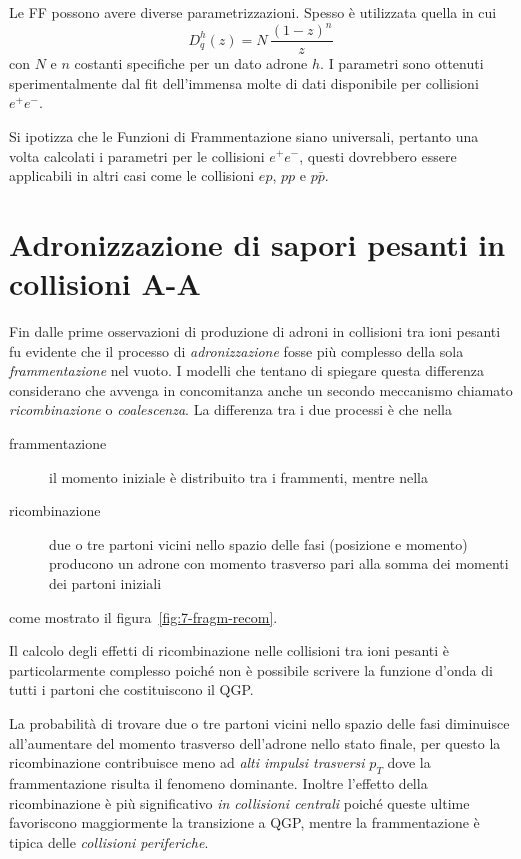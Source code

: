         Le FF possono avere diverse parametrizzazioni. Spesso è utilizzata quella in cui
        \begin{equation*}
            D_{q}^{h}(z) = N \, \frac{(1-z)^n}{z}
        \end{equation*}
        con $N$ e $n$ costanti specifiche per un dato adrone $h$. I parametri sono ottenuti sperimentalmente dal fit dell'immensa molte di dati disponibile per collisioni $e^{+} e^{-}$.

        Si ipotizza che le Funzioni di Frammentazione siano universali, pertanto una volta calcolati i parametri per le collisioni $e^{+} e^{-}$, questi dovrebbero essere applicabili in altri casi come le collisioni $ep$, $pp$ e $p\bar{p}$.

\newpage

\section{Adronizzazione di sapori pesanti in collisioni A-A}
    Fin dalle prime osservazioni di produzione di adroni in collisioni tra ioni pesanti fu evidente che il processo di \textit{adronizzazione} fosse più complesso della sola \textit{frammentazione} nel vuoto. I modelli che tentano di spiegare questa differenza considerano che avvenga in concomitanza anche un secondo meccanismo chiamato \textit{ricombinazione} o \textit{coalescenza}. La differenza tra i due processi è che nella
    \begin{description}
        \item[frammentazione] il momento iniziale è distribuito tra i frammenti, mentre nella

        \item[ricombinazione] due o tre partoni vicini nello spazio delle fasi (posizione e momento) producono un adrone con momento trasverso pari alla somma dei momenti dei partoni iniziali
    \end{description}
    come mostrato il figura~\ref{fig:7-fragm-recom}.

    Il calcolo degli effetti di ricombinazione nelle collisioni tra ioni pesanti è particolarmente complesso poiché non è possibile scrivere la funzione d'onda di tutti i partoni che costituiscono il QGP.

    La probabilità di trovare due o tre partoni vicini nello spazio delle fasi diminuisce all'aumentare del momento trasverso dell'adrone nello stato finale, per questo la ricombinazione contribuisce meno ad \textit{alti impulsi trasversi} $p_T$ dove la frammentazione risulta il fenomeno dominante. Inoltre l'effetto della ricombinazione è più significativo \textit{in collisioni centrali} poiché queste ultime favoriscono maggiormente la transizione a QGP, mentre la frammentazione è tipica delle \textit{collisioni periferiche}.

